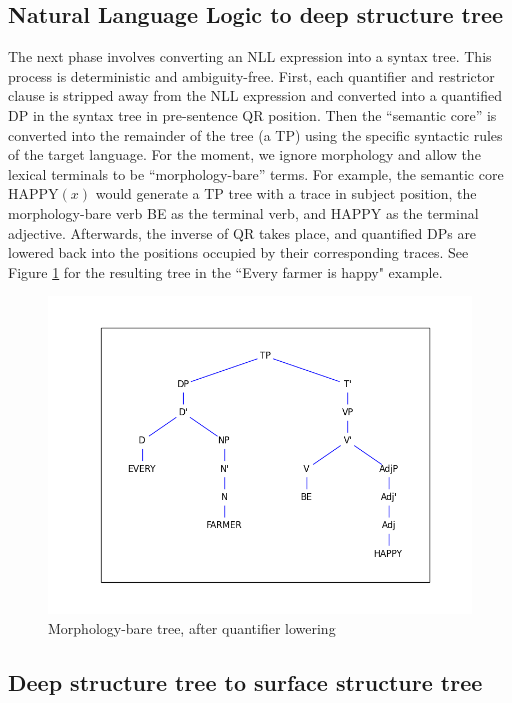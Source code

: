 \documentclass[11pt, oneside]{article}      %
\begin{document}
\subsection{Natural Language Logic to deep structure tree}

The next phase involves converting an NLL expression into a syntax tree.  This process is deterministic and ambiguity-free.  First, each quantifier and restrictor clause is stripped away from the NLL expression and converted into a quantified DP in the syntax tree in pre-sentence QR position.  Then the ``semantic core'' is converted into the remainder of the tree (a TP) using the specific syntactic rules of the target language.  For the moment, we ignore morphology and allow the lexical terminals to be ``morphology-bare'' terms.  For example, the semantic core HAPPY$(x)$ would generate a TP tree with a trace in subject position, the morphology-bare verb BE as the terminal verb, and HAPPY as the terminal adjective.  Afterwards, the inverse of QR takes place, and quantified DPs are lowered back into the positions occupied by their corresponding traces.  See Figure \ref{farmer_happy} for the resulting tree in the ``Every farmer is happy" example.

\begin{figure}[h] 
\centerline{\includegraphics[scale=.7]{happy_eng_3.png}}
\caption{Morphology-bare tree, after quantifier lowering} \label{farmer_happy}
\end{figure}

\subsection{Deep structure tree to surface structure tree}
\end{document}
